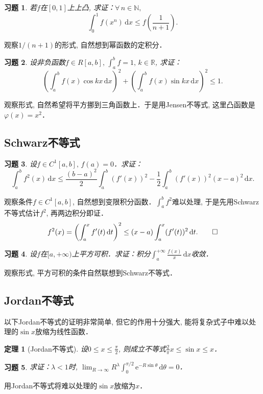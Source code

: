 \documentclass[11pt,a4paper]{ctexart}
\makeatletter
\theoremstyle{thmseries} %
\newtheorem{thm}{定理}[section]
\theoremstyle{exerseries}
\newtheorem{exer}{习题}[section]
\renewenvironment{proof}[1][\proofname]{\par
  \pushQED{\qed}%
  \normalfont \topsep6\p@\@plus6\p@\relax
  \trivlist
  \item[\hskip\labelsep
        \itshape
    #1\@addpunct{}]\ignorespaces
}{%
  \popQED\endtrivlist\@endpefalse
}
\newenvironment{pf}{\begin{proof}[\bfseries\upshape 证\quad]}{\end{proof}}
\newcommand{\bra}[1]{\mathopen{}\left(#1\right)}
\renewcommand{\phi}{\varphi}
\newcommand{\R}{\mathbb{R}}
\newcommand{\N}{\mathbb{N}}
\renewcommand{\d}{\mathrm{d}}
\newcommand{\e}{\mathrm{e}}
\makeatother
\begin{document}
\begin{exer}
	若$f$在$[0,1]$上上凸, 求证：$\forall\,n\in\N,$
	\[\int_{0}^{1}f(x^n)\,\d x\leq f\bra{\frac{1}{n+1}}.\]
\end{exer}
\begin{pf}
	观察$1/(n+1)$的形式, 自然想到幂函数的定积分．
\end{pf}

\begin{exer}
	设非负函数$f\in R[a,b],\,\int_{a}^{b}f=1,\,k\in\R$, 求证：
	\[\bra{\int_{a}^{b}f(x)\cos kx\,\d x}^2+\bra{\int_{a}^{b}f(x)\sin kx\,\d x}^2\leq1.\]
\end{exer}
\begin{pf}
	观察形式, 自然希望将平方挪到三角函数上．于是用Jensen不等式, 这里凸函数是$\phi(x)=x^2$．
\end{pf}

\subsection{Schwarz不等式}
\begin{exer}
	设$f\in C^1[a,b],\,f(a)=0$．求证：
	\[\int_{a}^{b}f^2(x)\,\d x\leq\frac{(b-a)^2}{2}\int_{a}^{b}(f'(x))^2-\frac{1}{2}\int_{a}^{b}(f'(x))^2(x-a)^2\,\d x.\]
\end{exer}
\begin{pf}
	观察条件$f\in C^1[a,b]$, 自然想到变限积分函数．$\int_{a}^{b} f^2$难以处理, 于是先用Schwarz不等式估计$f^2$, 再两边积分即证．
	\[f^2(x)=\bra{\int_{a}^{x}f'(t)\,\d t}^2\leq(x-a)\int_{a}^{x}(f'(t))^2\,\d t.\qedhere\]
\end{pf}

\begin{exer}
	设$f$在$[a,+\infty)$上平方可积．求证：积分$\int_{a}^{+\infty}\frac{f(x)}{x}\,\d x$收敛．
\end{exer}
\begin{pf}
	观察形式, 平方可积的条件自然联想到Schwarz不等式．
\end{pf}


\subsection{Jordan不等式}
以下Jordan不等式的证明非常简单, 但它的作用十分强大, 能将复杂式子中难以处理的$\sin x$放缩为线性函数．
\begin{thm}[Jordan不等式]
	设$0\leq x\leq\frac{\pi}{2}$, 则成立不等式$\frac{2}{\pi}x\leq\sin x\leq x$．
\end{thm}

\begin{exer}
	求证：$\lambda<1$时, $\lim_{R\to\infty}R^\lambda\int_{0}^{\pi/2}\e^{-R\sin\theta}\,\d\theta=0$．
\end{exer}
\begin{pf}
	用Jordan不等式将难以处理的$\sin x$放缩为$x$．
\end{pf}
\end{document}
